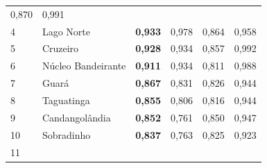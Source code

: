 \begin{center}
\begin{table}[]
\begin{tabular}{llllll}
            {\color[HTML]{202122} 0,870} &
            {\color[HTML]{202122} 0,991} \\
            \rowcolor[HTML]{F8F9FA}
            {\color[HTML]{202122} 4} &
            {\color[HTML]{0B0080} Lago Norte} &
            {\color[HTML]{202122} \textbf{0,933}} &
            {\color[HTML]{202122} 0,978} &
            {\color[HTML]{202122} 0,864} &
            {\color[HTML]{202122} 0,958} \\
            \rowcolor[HTML]{F8F9FA}
            {\color[HTML]{202122} 5} &
            {\color[HTML]{0B0080} Cruzeiro} &
            {\color[HTML]{202122} \textbf{0,928}} &
            {\color[HTML]{202122} 0,934} &
            {\color[HTML]{202122} 0,857} &
            {\color[HTML]{202122} 0,992} \\
            \rowcolor[HTML]{F8F9FA}
            {\color[HTML]{202122} 6} &
            {\color[HTML]{0B0080} Núcleo Bandeirante} &
            {\color[HTML]{202122} \textbf{0,911}} &
            {\color[HTML]{202122} 0,934} &
            {\color[HTML]{202122} 0,811} &
            {\color[HTML]{202122} 0,988} \\
            \rowcolor[HTML]{F8F9FA}
            {\color[HTML]{202122} 7} &
            {\color[HTML]{0B0080} Guará} &
            {\color[HTML]{202122} \textbf{0,867}} &
            {\color[HTML]{202122} 0,831} &
            {\color[HTML]{202122} 0,826} &
            {\color[HTML]{202122} 0,944} \\
            \rowcolor[HTML]{F8F9FA}
            {\color[HTML]{202122} 8} &
            {\color[HTML]{0B0080} Taguatinga} &
            {\color[HTML]{202122} \textbf{0,855}} &
            {\color[HTML]{202122} 0,806} &
            {\color[HTML]{202122} 0,816} &
            {\color[HTML]{202122} 0,944} \\
            \rowcolor[HTML]{F8F9FA}
            {\color[HTML]{202122} 9} &
            {\color[HTML]{0B0080} Candangolândia} &
            {\color[HTML]{202122} \textbf{0,852}} &
            {\color[HTML]{202122} 0,761} &
            {\color[HTML]{202122} 0,850} &
            {\color[HTML]{202122} 0,947} \\
            \rowcolor[HTML]{F8F9FA}
            {\color[HTML]{202122} 10} &
            {\color[HTML]{0B0080} Sobradinho} &
            {\color[HTML]{202122} \textbf{0,837}} &
            {\color[HTML]{202122} 0,763} &
            {\color[HTML]{202122} 0,825} &
            {\color[HTML]{202122} 0,923} \\
            \rowcolor[HTML]{F8F9FA}
            {\color[HTML]{202122} 11} &

\end{tabular}
\end{table}
\end{center}
